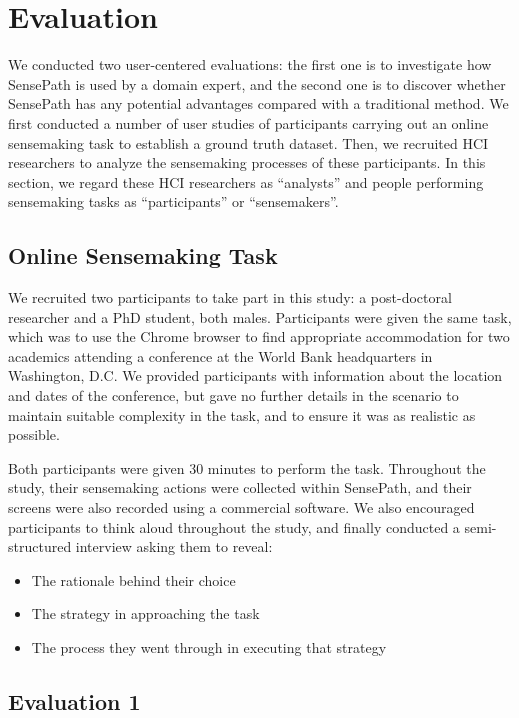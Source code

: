 \section{Evaluation}

We conducted two user-centered evaluations: the first one is to investigate how SensePath is used by a domain expert, and the second one is to discover whether SensePath has any potential advantages compared with a traditional method. We first conducted a number of user studies of participants carrying out an online sensemaking task to establish a ground truth dataset. Then, we recruited HCI researchers to analyze the sensemaking processes of these participants. In this section, we regard these HCI researchers as ``analysts'' and people performing sensemaking tasks as ``participants'' or ``sensemakers''.

\subsection{Online Sensemaking Task}
We recruited two participants to take part in this study: a post-doctoral researcher and a PhD student, both males. Participants were given the same task, which was to use the Chrome browser to find appropriate accommodation for two academics attending a conference at the World Bank headquarters in Washington, D.C. We provided participants with information about the location and dates of the conference, but gave no further details in the scenario to maintain suitable complexity in the task, and to ensure it was as realistic as possible.

Both participants were given 30 minutes to perform the task. Throughout the study, their sensemaking actions were collected within SensePath, and their screens were also recorded using a commercial software. We also encouraged participants to think aloud throughout the study, and finally conducted a semi-structured interview asking them to reveal:

\begin{itemize}
	\item The rationale behind their choice
	\item The strategy in approaching the task
	\item The process they went through in executing that strategy
\end{itemize}

\subsection{Evaluation 1}

